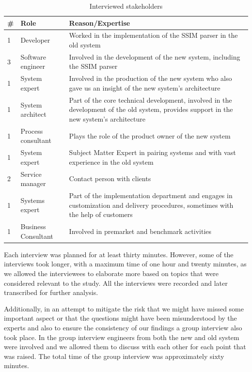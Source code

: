 \begin{table}[h]
\begin{center}
{\small 
\begin{tabular}{|p{.15cm}|p{1.3cm}|p{5.5cm}|}
\hline\hline
{\bf \#} & {\bf Role} & {\bf Reason/Expertise}\\
\hline
1 & Developer & Worked in the implementation of the SSIM parser in the old system\\
\hline
3 & Software engineer & Involved in the development of the new system, including the SSIM parser\\
\hline
1 & System expert & Involved in the production of the new system who also gave us an insight of the new system's architecture\\
\hline
1 & System architect & Part of the core technical development, involved in the development of the old system, provides support in the new system's architecture\\
\hline 
1 & Process consultant & Plays the role of the product owner of the new system\\
\hline
1 & System expert & Subject Matter Expert in pairing systems and with vast experience in the old system\\
\hline
2 & Service manager & Contact person with clients\\
\hline
1 & Systems expert  & Part of the implementation department and engages in customization and delivery procedures, sometimes with the help of customers\\
\hline
1 & Business Consultant & Involved in premarket and benchmark activities\\
\hline\hline
\end{tabular}}
\end{center}
\caption{Interviewed stakeholders}
\label{tab:stakeholders}
\end{table}


Each interview was planned for at least thirty minutes. However, some of the interviews took longer, with a maximum time of one hour and twenty minutes, as we allowed the interviewees to elaborate more based on topics that were considered relevant to the study. 
All the interviews were recorded and later transcribed for further analysis. 

Additionally, in an attempt to mitigate the risk that we might have missed some important aspect or that the questions might have been misunderstood by the experts and also to ensure the consistency of our findings a group interview also took place. In the group interview engineers from both the new and old system were involved and we allowed them to discuss with each other for each point that was raised. The total time of the group interview was approximately sixty minutes.

